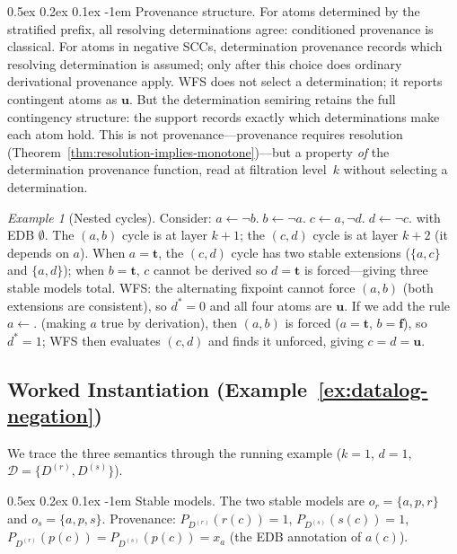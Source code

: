 \documentclass[acmsmall,review,anonymous]{acmart}
\makeatletter
\renewcommand{\paragraph}{\@startsection{paragraph}{4}{\z@}%
  {0.5ex \@plus 0.2ex \@minus 0.1ex}%
  {-1em}%
  {\normalfont\normalsize\bfseries}}
\theoremstyle{remark}
\newtheorem{example}{Example}
\numberwithin{definition}{section}
\numberwithin{theorem}{section}
\numberwithin{lemma}{section}
\numberwithin{corollary}{section}
\numberwithin{remark}{section}
\numberwithin{example}{section}
\numberwithin{observation}{section}
\numberwithin{assumption}{section}
\makeatother
\begin{document}
\paragraph{Provenance structure.}
For atoms determined by the stratified prefix, all resolving
determinations agree: conditioned provenance is classical.
For atoms in negative SCCs, determination provenance records which
resolving determination is assumed; only after this choice does
ordinary derivational provenance apply.
WFS does not select a determination; it reports contingent atoms as
$\mathbf{u}$.
But the determination semiring retains the full contingency structure:
the support records exactly which determinations make each atom hold.
This is not provenance---provenance requires resolution
(Theorem~\ref{thm:resolution-implies-monotone})---but a property
\emph{of} the determination provenance function, read at filtration
level~$k$ without selecting a determination.

\begin{example}[Nested cycles]
  Consider: $a \leftarrow \neg b.\; b \leftarrow \neg a.\;
  c \leftarrow a, \neg d.\; d \leftarrow \neg c.$
  with EDB $\emptyset$.
  The $(a,b)$ cycle is at layer $k{+}1$; the $(c,d)$ cycle is at layer
  $k{+}2$ (it depends on $a$).
  When $a = \mathbf{t}$, the $(c,d)$ cycle has two stable extensions
  ($\{a,c\}$ and $\{a,d\}$); when $b = \mathbf{t}$, $c$ cannot be
  derived so $d = \mathbf{t}$ is forced---giving three stable models
  total.
  WFS: the alternating fixpoint cannot force $(a,b)$ (both extensions
  are consistent), so $d^* = 0$ and all four atoms are $\mathbf{u}$.
  If we add the rule $a \leftarrow.$ (making $a$ true by derivation),
  then $(a,b)$ is forced ($a = \mathbf{t}$, $b = \mathbf{f}$), so
  $d^* = 1$; WFS then evaluates $(c,d)$ and finds it unforced, giving
  $c = d = \mathbf{u}$.
\end{example}

\subsection{Worked Instantiation (Example~\ref{ex:datalog-negation})}

We trace the three semantics through the running example ($k=1$,
$d=1$, $\mathcal{D} = \{D^{(r)}, D^{(s)}\}$).

\paragraph{Stable models.}
The two stable models are $o_r = \{a, p, r\}$ and $o_s = \{a, p, s\}$.
Provenance:
$P_{D^{(r)}}(r(c)) = 1$, $P_{D^{(s)}}(s(c)) = 1$,
$P_{D^{(r)}}(p(c)) = P_{D^{(s)}}(p(c)) = x_a$
(the EDB annotation of $a(c)$).
\end{document}
